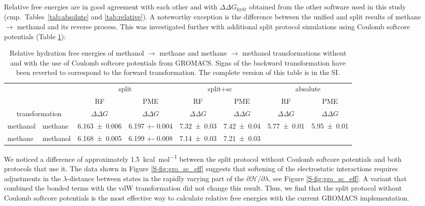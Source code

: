 \documentclass[journal=jctcce,manuscript=article]{achemso}
\begin{document}
Relative free energies are in good agreement with each other and with 
$\Delta \Delta G_{\mathrm{hydr}}$ obtained from the other software used in this 
study (cmp.\ Tables~\ref{tab:absolute} and \ref{tab:relative}).  A noteworthy 
exception is the difference between the unified and split results of methane 
$\rightarrow$ methanol and its reverse process. This  was investigated further with 
additional split protocol simulations using Coulomb softcore potentials (Table 
\ref{tab:eff-sc}):

\begin{table}[]
\centering
\caption{Relative hydration free energies of methanol $\rightarrow$ methane and 
methane $\rightarrow$ methanol transformations without and with the use of 
Coulomb softcore potentials from GROMACS. Signs of the backward 
transformation have been reverted to correspond to the forward transformation. 
The complete version of this table is in the SI.}
\label{tab:eff-sc}
\begin{tabular}{@{}llclclcl@{}}
\toprule
 &  & \multicolumn{2}{c}{split} & \multicolumn{2}{c}{split+sc} & 
 \multicolumn{2}{c}{absolute} \\
 &  & RF & \multicolumn{1}{c}{PME} & RF & \multicolumn{1}{c}{PME} & RF & 
 \multicolumn{1}{c}{PME} \\
\multicolumn{2}{c}{transformation} & $\Delta \Delta G$ & 
\multicolumn{1}{c}{$\Delta \Delta G$} & $\Delta \Delta G$ & 
\multicolumn{1}{c}{$\Delta \Delta G$} & $\Delta \Delta G$ & 
\multicolumn{1}{c}{$\Delta \Delta G$} \\ \midrule
methanol & methane & \multicolumn{1}{l}{\num{6.163 +- 0.006}} & \num{6.197 +- 
0.004} & \multicolumn{1}{l}{\num{7.32+-0.03}} & \num{7.42+-0.04} &
\multicolumn{1}{l}{\num{5.77 +- 0.01}} & \num{5.95 +- 0.01} \\
methane & methanol & \multicolumn{1}{l}{\num{6.168 +- 0.005}} & \num{6.199 +- 
0.008} & \multicolumn{1}{l}{\num{7.14+-0.03}} & \num{7.21+-0.03} & 
\multicolumn{1}{l}{} &  \\ \bottomrule
\end{tabular}
\end{table}

We noticed a difference of approximately \SI{1.5}{kcal.mol^{-1}} between the 
split protocol without Coulomb softcore potentials and both protocols that 
use it. The data shown in Figure \ref{S-fig:gro_sc_eff} 
suggests that softening of the 
electrostatic interactions requires  adjustments in the $\lambda$-distance between 
states in the rapidly varying part of the $\partial \mathcal{H}/\partial\lambda$, see 
Figure \ref{S-fig:gro_sc_eff}. 
A variant that combined the bonded terms with the vdW transformation did not change this result.  Thus, we find that the split protocol without Coulomb softcore potentials is the most effective way to calculate relative free energies with the current GROMACS implementation.
\end{document}

